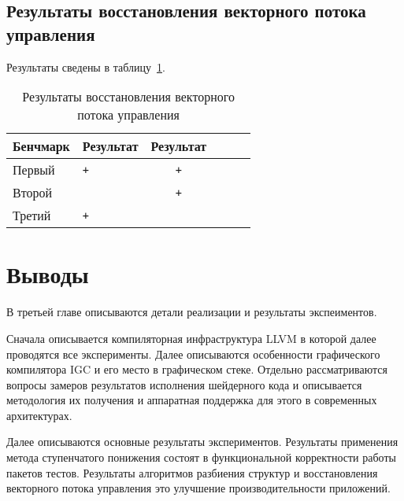 \subsection{Результаты восстановления векторного потока управления}\label{subsec:results/results/simdcf}

Результаты сведены в таблицу~\cref{tab:results/simdcf}.

\begin{table}
    \centering
    \captionsetup{justification=centering}
    \caption{Результаты восстановления векторного потока управления}\label{tab:results/simdcf}
    \begin{tabular}{llc|llc}
        \toprule
        Бенчмарк & Результат & Результат \\
        \midrule
        Первый   & \verb|+|  & \verb|+|  \\
        Второй   & \verb| |  & \verb|+|  \\
        Третий   & \verb|+|  & \verb| |  \\
        \bottomrule
    \end{tabular}
\end{table}

\section{Выводы}\label{sec:results/outcome}

В третьей главе описываются детали реализации и результаты экспеиментов.

Сначала описывается компиляторная инфраструктура LLVM в которой далее проводятся все эксперименты. Далее описываются особенности графического компилятора IGC и его место в графическом стеке. Отдельно рассматриваются вопросы замеров результатов исполнения шейдерного кода и описывается методология их получения и аппаратная поддержка для этого в современных архитектурах.

Далее описываются основные результаты экспериментов. Результаты применения метода ступенчатого понижения состоят в функциональной корректности работы пакетов тестов. Результаты алгоритмов разбиения структур и восстановления векторного потока управления это улучшение производительности приложений.

\FloatBarrier